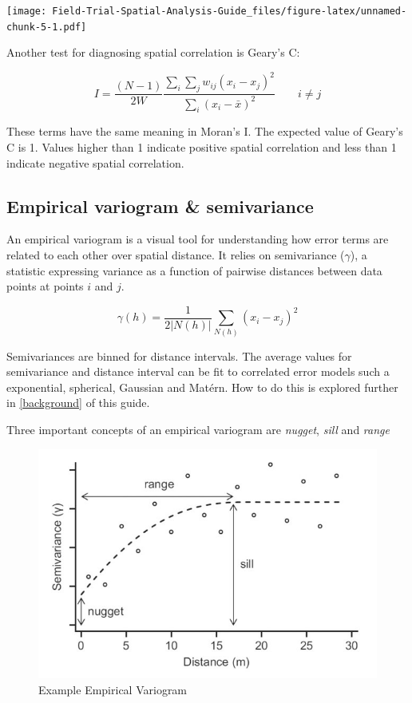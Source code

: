 \documentclass[
]{book}
\begin{document}
\texttt{[image: Field-Trial-Spatial-Analysis-Guide\_files/figure-latex/unnamed-chunk-5-1.pdf]}

Another test for diagnosing spatial correlation is Geary's C:

\[ I = \frac{(N -1)}{2W}\frac{\sum_i \sum_j w_{ij} (x_i - x_j)^2}{\sum_i(x_i - \bar{x})^2} \qquad i \neq j\]

These terms have the same meaning in Moran's I. The expected value of Geary's C is 1. Values higher than 1 indicate positive spatial correlation and less than 1 indicate negative spatial correlation.

\hypertarget{empirical-variogram-semivariance}{%
\subsection{Empirical variogram \& semivariance}\label{empirical-variogram-semivariance}}

An empirical variogram is a visual tool for understanding how error terms are related to each other over spatial distance. It relies on semivariance (\(\gamma\)), a statistic expressing variance as a function of pairwise distances between data points at points \(i\) and \(j\).

\[\gamma(h) = \frac{1}{2|N(h)|}\sum_{N(h)}(x_i - x_j)^2\]

Semivariances are binned for distance intervals. The average values for semivariance and distance interval can be fit to correlated error models such a exponential, spherical, Gaussian and Matérn. How to do this is explored further in \ref{background} of this guide.

Three important concepts of an empirical variogram are \emph{nugget}, \emph{sill} and \emph{range}

\begin{figure}
\centering
\includegraphics{img/Sadoti2014_spherical.jpg}
\caption{Example Empirical Variogram}
\end{figure}
\end{document}
